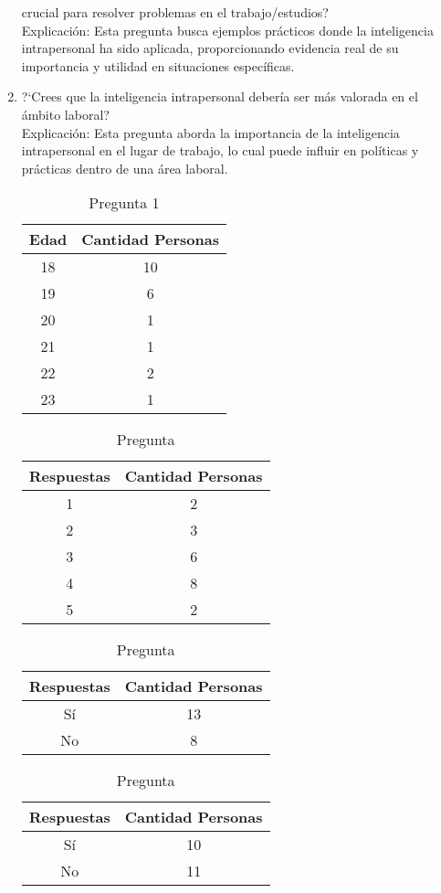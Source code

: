 \begin{enumerate}
crucial para resolver problemas en el trabajo/estudios?\\
Explicación: Esta pregunta busca ejemplos prácticos donde la inteligencia intrapersonal ha sido aplicada, proporcionando evidencia real de su importancia y utilidad en situaciones específicas.
\item ?`Crees que la inteligencia intrapersonal deber\'ia ser m\'as valorada en el
\'ambito laboral?\\
Explicación: Esta pregunta aborda la importancia de la inteligencia intrapersonal en el lugar de trabajo, lo cual puede influir en políticas y prácticas dentro de una área laboral.
\begin{table}
	\caption{Pregunta 1\label{tab:pregunta1}}
\begin{tabular}{cc}
\hline
Edad & Cantidad Personas\\
\hline
18 & 10\\
19 & 6\\
20 & 1\\
21 & 1\\
22 & 2\\
23 & 1\\
\hline
\end{tabular}
\end{table}
\begin{table}
	\caption{Pregunta \thetable\label{pregunta2}}
\begin{tabular}{cc}
\hline
Respuestas & Cantidad Personas\\
\hline
1 & 2\\
2 & 3\\
3 & 6\\
4 & 8\\
5 & 2\\
\hline
\end{tabular}
\end{table}
\begin{table}
	\caption{Pregunta \thetable\label{pregunta3}}
\begin{tabular}{cc}
\hline
Respuestas & Cantidad Personas\\
\hline
S\'i & 13\\
No & 8\\
\hline
\end{tabular}
\end{table}
\begin{table}
	\caption{Pregunta \thetable\label{pregunta4}}
\begin{tabular}{cc}
\hline
Respuestas & Cantidad Personas\\
\hline
S\'i & 10\\
No & 11\\
\hline
\end{tabular}
\end{table}


\end{enumerate}
